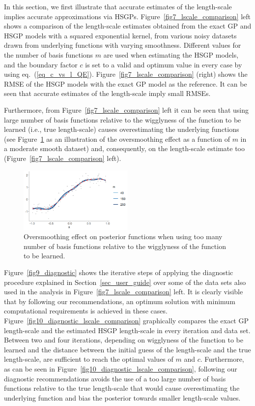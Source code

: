 In this section, we first illustrate that accurate estimates of the length-scale implies accurate approximations via HSGPs. Figure~\ref{fig7_lscale_comparison} left shows a comparison of the length-scale estimates
obtained from the exact GP and HSGP models with a squared exponential kernel, from various noisy datasets drawn from underlying functions with varying smoothness. Different values for the number of basis functions $m$ are used when estimating the HSGP models, and the boundary factor $c$ is set to a valid and optimum value in every case by using eq.~(\ref{eq_c_vs_l_QE}). Figure~\ref{fig7_lscale_comparison} (right) shows the RMSE of the HSGP models with the exact GP model as the reference. It can be seen that accurate estimates of the length-scale imply small RMSEs.

Furthermore, from Figure~\ref{fig7_lscale_comparison} left it can be seen that using large number of basis functions relative to the wigglyness of the function to be learned (i.e., true length-scale) causes overestimating the underlying functions (see Figure~\ref{fig8_oversmoothed_posterios} as an illustration of the oversmoothing effect as a function of $m$ in a moderate smooth dataset) and, consequently, on the length-scale estimate too (Figure~\ref{fig7_lscale_comparison} left). 

\begin{figure}
\centering
\includegraphics[width=0.5\textwidth, trim = 0mm 0mm 0mm 0mm, clip]{fig8_oversmoothed_posterios.png}
\caption{Oversmoothing effect on posterior functions when using too many number of basis functions relative to the wigglyness of the function to be learned.}
  \label{fig8_oversmoothed_posterios}
\end{figure}

Figure~\ref{fig9_diagnostic} shows the iterative steps of applying the diagnostic procedure explained in Section~\ref{sec_user_guide} over some of the data sets also used in the analysis in Figure~\ref{fig7_lscale_comparison} left. It is clearly visible that by following our recommendations, an optimum solution with minimum computational requirements is achieved in these cases. Figure~\ref{fig10_diagnostic_lscale_comparison} graphically compares the exact GP length-scale and the estimated HSGP length-scale in every iteration and data set. Between two and four iterations, depending on wigglyness of the function to be learned and the distance between the initial guess of the length-scale and the true length-scale, are sufficient to reach the optimal values of $m$ and $c$. Furthermore, as can be seen in Figure~\ref{fig10_diagnostic_lscale_comparison}, following our diagnostic recommendations avoids the use of a too large number of basis functions relative to the true length-scale that would cause overestimating the underlying function and bias the posterior towards smaller length-scale values.

